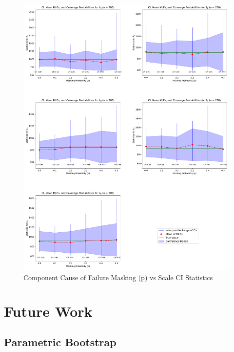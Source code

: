 \documentclass[
]{article}
\begin{document}
\begin{figure}

{\centering \includegraphics{image/plot-p-vs-stats-scale} 

}

\caption{Component Cause of Failure Masking (p) vs Scale CI Statistics}\label{fig:masking-prob-vs-stats-scale}
\end{figure}

\hypertarget{future-work}{%
\section{Future Work}\label{future-work}}

\hypertarget{parametric-bootstrap}{%
\subsection*{Parametric Bootstrap}\label{parametric-bootstrap}}
\end{document}
